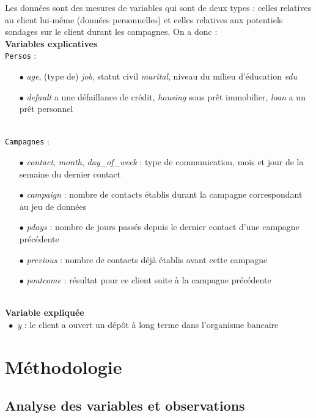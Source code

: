 \documentclass[]{article}
\begin{document}
\par Les données sont des mesures de variables qui sont de deux types : celles relatives au client lui-même (données personnelles) et celles relatives aux potentiels sondages sur le client durant les campagnes. On a donc :\newline
~\\
\vspace{0.2cm}
\textbf{Variables explicatives}\\
\vspace{0.1cm}
\indent \texttt{Persos} :
\begin{itemize}
\item[$\bullet$] \textit{age}, (type de) \textit{job}, statut civil \textit{marital}, niveau du milieu d'éducation \textit{edu}
\item[$\bullet$] \textit{default} a une défaillance de crédit, \textit{housing} sous prêt immobilier, \textit{loan} a un prêt personnel
\end{itemize}
~\\
\indent \texttt{Campagnes} :
\begin{itemize}
\item[$\bullet$] \textit{contact}, \textit{month}, \textit{day\_of\_week} : type de communication, mois et jour de la semaine du dernier contact
\item[$\bullet$] \textit{campaign} : nombre de contacts établis durant la campagne correspondant au jeu de données
\item[$\bullet$] \textit{pdays} : nombre de jours passés depuis le dernier contact d'une campagne précédente
\item[$\bullet$] \textit{previous} : nombre de contacts déjà établis avant cette campagne
\item[$\bullet$] \textit{poutcome} : résultat pour ce client suite à la campagne précédente
\end{itemize}


~\\
\textbf{Variable expliquée}\\
\indent $\; \bullet$ \textit{y} : le client a ouvert un dépôt à long terme dans l'organisme bancaire

\section{Méthodologie}

\subsection{Analyse des variables et observations}
\end{document}
